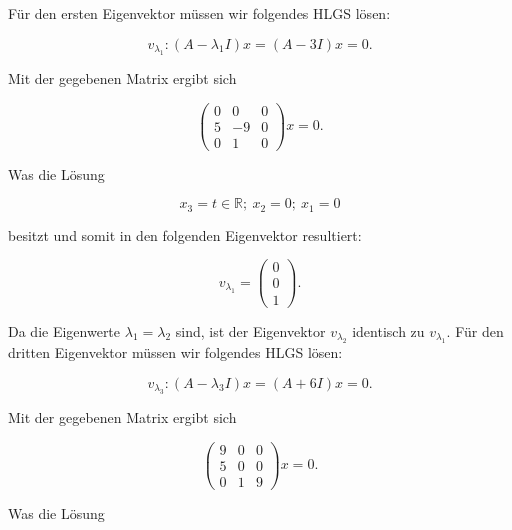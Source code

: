 \vspace{1\baselineskip}

Für den ersten Eigenvektor müssen wir folgendes HLGS lösen:

\begin{equation*}
    v_{\lambda_1}: (A - \lambda_1 I) x = (A - 3I) x = 0. 
\end{equation*}

Mit der gegebenen Matrix ergibt sich

\begin{equation*}
        \begin{pmatrix} 0 & 0 & 0 \\ 5 & -9 & 0 \\ 0 & 1 & 0 \end{pmatrix} x = 0. 
\end{equation*}

Was die Lösung

\begin{equation*}
        x_3 = t \in \mathbb{R};\ x_2 = 0;\ x_1 = 0 
\end{equation*}

besitzt und somit in den folgenden Eigenvektor resultiert:

\begin{equation*}
        v_{\lambda_1} = \begin{pmatrix} 0 \\ 0 \\ 1 \end{pmatrix}.
\end{equation*}

Da die Eigenwerte \( \lambda_1 = \lambda_2 \) sind, ist der Eigenvektor \( v_{\lambda_2} \) identisch zu \( v_{\lambda_1} \). Für den dritten Eigenvektor müssen wir folgendes HLGS lösen:

\begin{equation*}
    v_{\lambda_3}: (A - \lambda_3 I) x = (A + 6I) x = 0.
\end{equation*}

Mit der gegebenen Matrix ergibt sich

\begin{equation*}
        \begin{pmatrix} 9 & 0 & 0 \\ 5 & 0 & 0 \\ 0 & 1 & 9 \end{pmatrix} x = 0.
\end{equation*}

Was die Lösung

